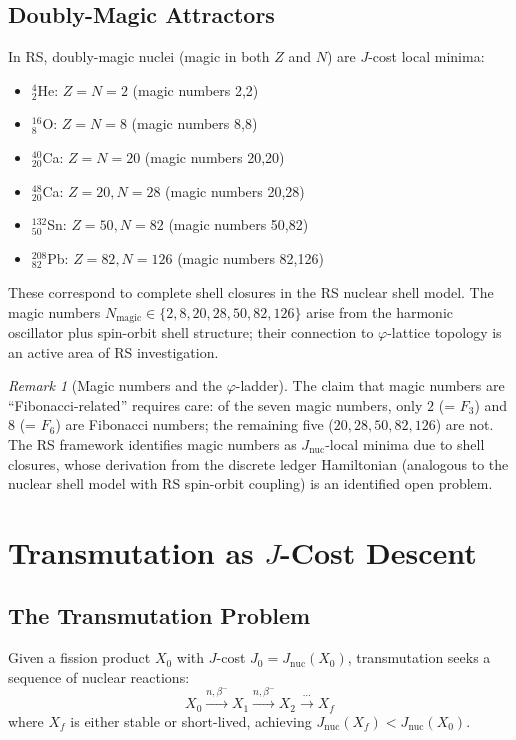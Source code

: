 \documentclass[12pt,a4paper]{article}
\theoremstyle{definition}
\theoremstyle{remark}
\newtheorem{remark}[theorem]{Remark}
\begin{document}
\subsection{Doubly-Magic Attractors}

In RS, doubly-magic nuclei (magic in both $Z$ and $N$) are $J$-cost local minima:
\begin{itemize}
\item ${}^4_2$He: $Z = N = 2$ (magic numbers 2,2)
\item ${}^{16}_8$O: $Z = N = 8$ (magic numbers 8,8)
\item ${}^{40}_{20}$Ca: $Z = N = 20$ (magic numbers 20,20)
\item ${}^{48}_{20}$Ca: $Z = 20, N = 28$ (magic numbers 20,28)
\item ${}^{132}_{50}$Sn: $Z = 50, N = 82$ (magic numbers 50,82)
\item ${}^{208}_{82}$Pb: $Z = 82, N = 126$ (magic numbers 82,126)
\end{itemize}

These correspond to complete shell closures in the RS nuclear shell model.
The magic numbers $N_\mathrm{magic} \in \{2, 8, 20, 28, 50, 82, 126\}$ arise from
the harmonic oscillator plus spin-orbit shell structure; their connection to
$\varphi$-lattice topology is an active area of RS investigation.

\begin{remark}[Magic numbers and the $\varphi$-ladder]
The claim that magic numbers are ``Fibonacci-related'' requires care:
of the seven magic numbers, only $2$ (= $F_3$) and $8$ (= $F_6$) are
Fibonacci numbers; the remaining five ($20, 28, 50, 82, 126$) are not.
The RS framework identifies magic numbers as $J_\mathrm{nuc}$-local minima
due to shell closures, whose derivation from the discrete ledger Hamiltonian
(analogous to the nuclear shell model with RS spin-orbit coupling) is an
identified open problem.
\end{remark}

\section{Transmutation as $J$-Cost Descent}

\subsection{The Transmutation Problem}

Given a fission product $X_0$ with $J$-cost $J_0 = J_\mathrm{nuc}(X_0)$, 
transmutation seeks a sequence of nuclear reactions:
\begin{equation}
X_0 \xrightarrow{n, \beta^-} X_1 \xrightarrow{n, \beta^-} X_2 \xrightarrow{\cdots} X_f
\end{equation}
where $X_f$ is either stable or short-lived, achieving $J_\mathrm{nuc}(X_f) < J_\mathrm{nuc}(X_0)$.
\end{document}
